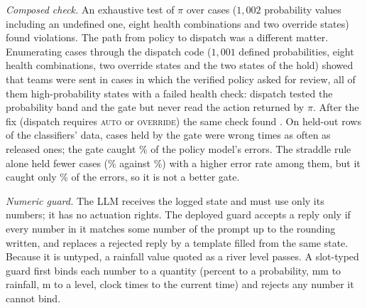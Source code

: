 \documentclass[conference]{IEEEtran}
\begin{document}
\textit{Composed check.} An exhaustive test of $\pi$ over \AgPolCases{} cases ($1{,}002$ probability values including an undefined one, eight health combinations and two override states) found \AgPolViol{} violations. The path from policy to dispatch was a different matter. Enumerating \AgEtoECases{} cases through the dispatch code ($1{,}001$ defined probabilities, eight health combinations, two override states and the two states of the hold) showed that teams were sent in \AgEtoEViolBefore{} cases in which the verified policy asked for review, all of them high-probability states with a failed health check: dispatch tested the probability band and the gate but never read the action returned by $\pi$. After the fix (dispatch requires \textsc{auto} or \textsc{override}) the same check found \AgEtoEViolAfter. On \AgCalTest{} held-out rows of the classifiers' data, cases held by the gate were wrong \AgGateDepErrRatio{} times as often as released ones; the gate caught \AgGtDepRecall\% of the policy model's errors. The straddle rule alone held fewer cases (\AgGateStHold\% against \AgGateDepHold\%) with a higher error rate among them, but it caught only \AgGtStRecall\% of the errors, so it is not a better gate.

\textit{Numeric guard.} The LLM receives the logged state and must use only its numbers; it has no actuation rights. The deployed guard accepts a reply only if every number in it matches some number of the prompt up to the rounding written, and replaces a rejected reply by a template filled from the same state. Because it is untyped, a rainfall value quoted as a river level passes. A slot-typed guard first binds each number to a quantity (percent to a probability, mm to rainfall, m to a level, clock times to the current time) and rejects any number it cannot bind.
\end{document}
